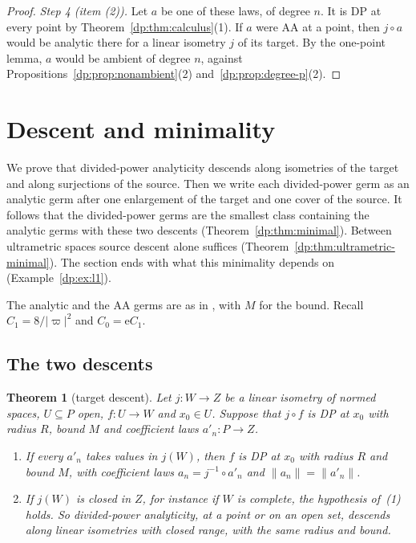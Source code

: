 \documentclass[11pt]{amsart}
\newtheorem{theorem}{Theorem}[section]
\theoremstyle{definition}
\theoremstyle{remark}
\numberwithin{equation}{section}
\newcommand{\abs}[1]{\lvert #1\rvert}
\newcommand{\norm}[1]{\lVert #1\rVert}
\theoremstyle{plain}
\theoremstyle{definition}
\theoremstyle{plain}
\begin{document}
\begin{proof}
\emph{Step 4 (item (2)).} Let $a$ be one of these laws, of degree $n$. It is DP at every point by Theorem~\ref{dp:thm:calculus}(1). If $a$ were AA at a point, then $j\circ a$ would be analytic there for a linear isometry $j$ of its target. By the one-point lemma, $a$ would be ambient of degree $n$, against Propositions~\ref{dp:prop:nonambient}(2) and~\ref{dp:prop:degree-p}(2).
\end{proof}
\section{Descent and minimality}\label{dp:sec:descent}

We prove that divided-power analyticity descends along isometries of the target and along surjections of the source. Then we write each divided-power germ as an analytic germ after one enlargement of the target and one cover of the source. It follows that the divided-power germs are the smallest class containing the analytic germs with these two descents (Theorem~\ref{dp:thm:minimal}). Between ultrametric spaces source descent alone suffices (Theorem~\ref{dp:thm:ultrametric-minimal}). The section ends with what this minimality depends on (Example~\ref{dp:ex:l1}).

The analytic and the AA germs are as in \cite[Definition~14.7]{I}, with $M$ for the bound. Recall $C_1=8/\abs\varpi^2$ and $C_0=\mathrm eC_1$.

\subsection{The two descents}\label{dp:ssec:two-descents}

\begin{theorem}[target descent]\label{dp:thm:target-descent}
Let $j\colon W\to Z$ be a linear isometry of normed spaces, $U\subseteq P$ open, $f\colon U\to W$ and $x_0\in U$. Suppose that $j\circ f$ is DP at $x_0$ with radius $R$, bound $M$ and coefficient laws $a'_n\colon P\to Z$.
\begin{enumerate}
\item If every $a'_n$ takes values in $j(W)$, then $f$ is DP at $x_0$ with radius $R$ and bound $M$, with coefficient laws $a_n=j^{-1}\circ a'_n$ and $\norm{a_n}=\norm{a'_n}$.
\item If $j(W)$ is closed in $Z$, for instance if $W$ is complete, the hypothesis of~(1) holds. So divided-power analyticity, at a point or on an open set, descends along linear isometries with closed range, with the same radius and bound.
\end{enumerate}
\end{theorem}
\end{document}
